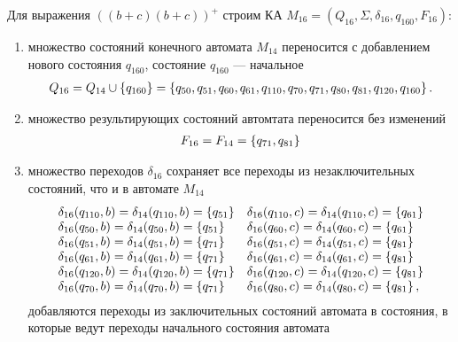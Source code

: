 \newpage
Для выражения \(((b+c)(b+c))^+\) строим КА \(M_{16} = (Q_{16}, \Sigma, \delta_{16}, q_{160}, F_{16})\):
\begin{enumerate}
	\item множество состояний конечного автомата \(M_{14}\) переносится с добавлением нового состояния \(q_{160}\), состояние \(q_{160}\) --- начальное
	      \begin{align*}
		      Q_{16} = Q_{14} \cup \left\{q_{160}\right\} =\left\{q_{50}, q_{51}, q_{60}, q_{61}, q_{110}, q_{70}, q_{71}, q_{80}, q_{81}, q_{120}, q_{160}\right\}.
	      \end{align*}
	\item множество результирующих состояний автомтата переносится без изменений
	      \begin{align*}
		      F_{16} = F_{14} = \left\{q_{71}, q_{81}\right\}
	      \end{align*}
	\item множество переходов \(\delta_{16}\) сохраняет все переходы из незаключительных состояний, что и в автомате \(M_{14}\)
	      \begin{align*}
		      \begin{array}{ll}
			      \delta_{16}(q_{110}, b) = \delta_{14}(q_{110}, b) = \left\{q_{51}\right\} & \delta_{16}(q_{110}, c) = \delta_{14}(q_{110}, c) = \left\{q_{61}\right\} \\
			      \delta_{16}(q_{50}, b)  = \delta_{14}(q_{50}, b)  = \left\{q_{51}\right\} & \delta_{16}(q_{60}, c)  = \delta_{14}(q_{60}, c)  = \left\{q_{61}\right\} \\
			      \delta_{16}(q_{51}, b)  = \delta_{14}(q_{51}, b)  = \left\{q_{71}\right\} & \delta_{16}(q_{51}, c)  = \delta_{14}(q_{51}, c)  = \left\{q_{81}\right\} \\
			      \delta_{16}(q_{61}, b)  = \delta_{14}(q_{61}, b)  = \left\{q_{71}\right\} & \delta_{16}(q_{61}, c)  = \delta_{14}(q_{61}, c)  = \left\{q_{81}\right\} \\
			      \delta_{16}(q_{120}, b) = \delta_{14}(q_{120}, b) = \left\{q_{71}\right\} & \delta_{16}(q_{120}, c) = \delta_{14}(q_{120}, c) = \left\{q_{81}\right\} \\
			      \delta_{16}(q_{70}, b)  = \delta_{14}(q_{70}, b) = \left\{q_{71}\right\}  & \delta_{16}(q_{80}, c) =  \delta_{14}(q_{80}, c) = \left\{q_{81}\right\},
		      \end{array}
	      \end{align*}
	      добавляются переходы из заключительных состояний автомата в состояния, в которые ведут переходы начального состояния автомата
	      \begin{align*}
		      \begin{array}{ll}

\end{array}
\end{align*}
\end{enumerate}
